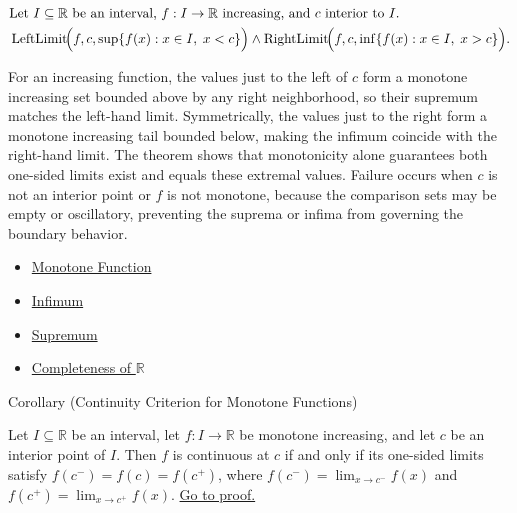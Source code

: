 \begin{remark*}
\[
\begin{aligned}
&\text{Let } I\subseteq \mathbb{R} \text{ be an interval, } f:I\to\mathbb{R} \text{ increasing, and } c \text{ interior to } I.\\
&\operatorname{LeftLimit}\!\Bigl(f,c,\sup\{f(x): x\in I,\; x<c\}\Bigr)
\land
\operatorname{RightLimit}\!\Bigl(f,c,\inf\{f(x): x\in I,\; x>c\}\Bigr).
\end{aligned}
\]
\end{remark*}

\begin{remark*}[Interpretation]
For an increasing function, the values just to the left of $c$ form a monotone increasing set bounded above by any right neighborhood, so their supremum matches the left-hand limit. Symmetrically, the values just to the right form a monotone increasing tail bounded below, making the infimum coincide with the right-hand limit. The theorem shows that monotonicity alone guarantees both one-sided limits exist and equals these extremal values. Failure occurs when $c$ is not an interior point or $f$ is not monotone, because the comparison sets may be empty or oscillatory, preventing the suprema or infima from governing the boundary behavior.
\end{remark*}

\begin{dependencies}
\begin{itemize}
  \item \hyperref[def:function-monotone]{Monotone Function}
  \item \hyperref[def:infimum]{Infimum}
  \item \hyperref[def:supremum]{Supremum}
  \item \hyperref[ax:completeness-of-reals]{Completeness of $\mathbb{R}$}
\end{itemize}
\end{dependencies}
\begin{corollarybox}{Corollary (Continuity Criterion for Monotone Functions)}
\begin{corollary}
\label{cor:monotone-continuity-criterion}
Let $I \subseteq \mathbb{R}$ be an interval, let $f:I \to \mathbb{R}$ be monotone increasing, and let $c$ be an interior point of $I$. Then $f$ is continuous at $c$ if and only if its one-sided limits satisfy $f(c^-)=f(c)=f(c^+)$, where $f(c^-)=\lim_{x\to c^-} f(x)$ and $f(c^+)=\lim_{x\to c^+} f(x)$.
\hyperref[prf:monotone-continuity-criterion]{Go to proof.}
\end{corollary}
\end{corollarybox}

